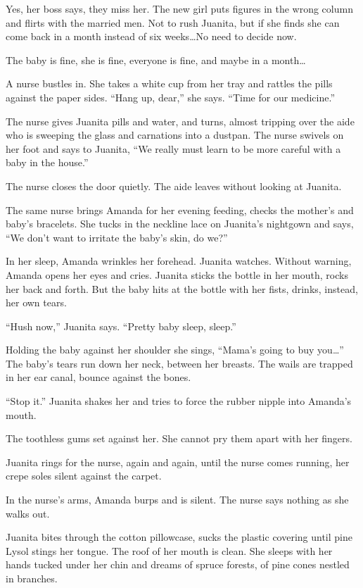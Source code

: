 \documentclass[
]{article}
\begin{document}
Yes, her boss says, they miss her. The new girl puts figures in the
wrong column and flirts with the married men. Not to rush Juanita, but
if she finds she can come back in a month instead of six weeks\ldots No
need to decide now.

The baby is fine, she is fine, everyone is fine, and maybe in a
month\ldots{}

A nurse bustles in. She takes a white cup from her tray and rattles the
pills against the paper sides. ``Hang up, dear,'' she says. ``Time for
our medicine.''

The nurse gives Juanita pills and water, and turns, almost tripping over
the aide who is sweep­ing the glass and carnations into a dustpan. The
nurse swivels on her foot and says to Juanita, ``We really must learn to
be more careful with a baby in the house.''

The nurse closes the door quietly. The aide leaves without looking at
Juanita.

The same nurse brings Amanda for her evening feeding, checks the
mother's and baby's bracelets. She tucks in the neckline lace on
Juanita's nightgown and says, ``We don't want to irritate the baby's
skin, do we?''

In her sleep, Amanda wrinkles her forehead. Juanita watches. Without
warning, Amanda opens her eyes and cries. Juanita sticks the bottle in
her mouth, rocks her back and forth. But the baby hits at the bottle
with her fists, drinks, instead, her own tears.

``Hush now,'' Juanita says. ``Pretty baby sleep, sleep.''

Holding the baby against her shoulder she sings, ``Mama's going to buy
you\ldots'' The baby's tears run down her neck, between her breasts. The
wails are trapped in her ear canal, bounce against the bones.

``Stop it.'' Juanita shakes her and tries to force the rubber nipple
into Amanda's mouth.

The toothless gums set against her. She cannot pry them apart with her
fingers.

Juanita rings for the nurse, again and again, until the nurse comes
running, her crepe soles silent against the carpet.

In the nurse's arms, Amanda burps and is silent. The nurse says nothing
as she walks out.

Juanita bites through the cotton pillowcase, sucks the plastic covering
until pine Lysol stings her tongue. The roof of her mouth is clean. She
sleeps with her hands tucked under her chin and dreams of spruce
forests, of pine cones nestled in branches.
\end{document}
